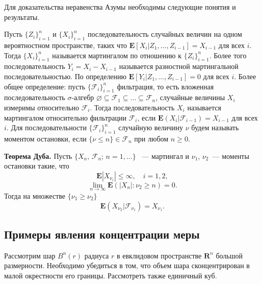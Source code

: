 \medskip 

Для доказательства неравенства Азумы необходимы следующие понятия и результаты.

 Пусть $\{Z_i\}^{n}_{i=1}$ и  $\{X_i\}^n_{i=1}$ последовательность случайных величин на одном вероятностном пространстве, таких что $\mathbf{E}[X_i|Z_1,\dots,Z_{i-1}] = X_{i-1}$ для всех $i$. Тогда $\{X_i\}^n_{i=1}$ называется мартингалом по отношению к $\{Z_i\}^{n}_{i=1}$. Более того последовательность $Y_i = X_i-X_{i-1}$ называется разностной мартингальной последовательностью. По определению  $\mathbf{E}[Y_i|Z_1,\dots,Z_{i-1}] = 0$ для всех $i$.
Более общее определение: пусть $\{\mathcal{F}_i\}_{i=1}^n$ фильтрация, то есть вложенная последовательность $\sigma$-алгебр $\varnothing \subseteq \mathcal{F}_1\subseteq \dots \subseteq\mathcal{F}_n$, случайные величины $X_i$ измеримы относительно $\mathcal{F}_i$. Тогда  последовательность $X_i$ называется мартингалом относительно фильтрации $\mathcal{F}_i$, если $\mathbf{E}(X_i|\mathcal{F}_{i-1})=X_{i-1}$ для всех $i$.
Для последовательности $\{\mathcal{F}_i\}_{i=1}^n$  случайную величину $\nu$ будем называть моментом остановки, если $\{\nu\leq n\}\in \mathcal{F}_n$ при любом $n\geq 0$.

\textbf{Теорема Дуба.}  Пусть $\{X_n,\, \mathcal{F}_n;\,n=1,\dots\}$ ~--- мартингал и $\nu_1$, $\nu_2$~--- моменты остановки такие, что 
\begin{equation*}
\mathbf{E}|X_{\nu_i}|\leq \infty,\quad i=1,2,
\end{equation*}
\begin{equation*}
\lim_{n\to\infty}\mathbf{E}(|X_n|:\nu_2\geq n) = 0.
\end{equation*}
Тогда на множестве $\{\nu_1\geq \nu_2\}$
\begin{equation*}
\mathbf{E}(X_{\nu_2}|\mathcal{F}_{\nu_1}) = X_{\nu_1}.
\end{equation*}

\medskip

\subsection {Примеры явления концентрации меры}

\begin{problem} 
Рассмотрим шар $B^{n}(r)$ радиуса $r$ в евклидовом пространстве $\mathbf{R}^n$ большой размерности. 
 Необходимо убедиться в том, что объем шара сконцентрирован в малой окрестности его границы.
Рассмотреть также единичный куб.
\end{problem}

